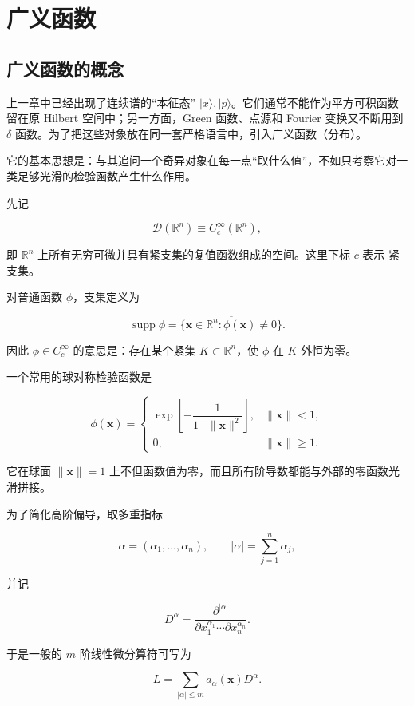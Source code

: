 \chapter{广义函数} \label{chap:math-distributions}
\label{chap:distributions-fourier}

\section{广义函数的概念}
\label{sec:distribution-concept}

上一章中已经出现了连续谱的``本征态'' $|x\rangle,|p\rangle$。它们通常不能作为平方可积函数留在原 Hilbert 空间中；另一方面，Green 函数、点源和 Fourier 变换又不断用到 $\delta$ 函数。为了把这些对象放在同一套严格语言中，引入广义函数（分布）。

它的基本思想是：与其追问一个奇异对象在每一点``取什么值''，不如只考察它对一类足够光滑的检验函数产生什么作用。

先记

\[
\mathcal D(\mathbb R^n)\equiv C_c^\infty(\mathbb R^n),
\]

即 $\mathbb R^n$ 上所有无穷可微并具有紧支集的复值函数组成的空间。这里下标 $c$ 表示 紧 支集。

对普通函数 $\phi$，支集定义为

\[
\operatorname{supp}\phi
=\overline{\{\mathbf x\in\mathbb R^n:\phi(\mathbf x)\neq0\}}.
\]

因此 $\phi\in C_c^\infty$ 的意思是：存在某个紧集 $K\subset\mathbb R^n$，使 $\phi$ 在 $K$ 外恒为零。

一个常用的球对称检验函数是

\[
\phi(\mathbf x)=
\begin{cases}
\exp\!\left[-\dfrac1{1-\|\mathbf x\|^2}\right],&\|\mathbf x\|<1,\\[4pt]
0,&\|\mathbf x\|\ge1.
\end{cases}
\]

它在球面 $\|\mathbf x\|=1$ 上不但函数值为零，而且所有阶导数都能与外部的零函数光滑拼接。

为了简化高阶偏导，取多重指标

\[
\alpha=(\alpha_1,\ldots,\alpha_n),\qquad
|\alpha|=\sum_{j=1}^n\alpha_j,
\]

并记

\[
D^\alpha
=\frac{\partial^{|\alpha|}}
{\partial x_1^{\alpha_1}\cdots\partial x_n^{\alpha_n}}.
\]

于是一般的 $m$ 阶线性微分算符可写为

\[
L=\sum_{|\alpha|\le m}a_\alpha(\mathbf x)D^\alpha.
\]

